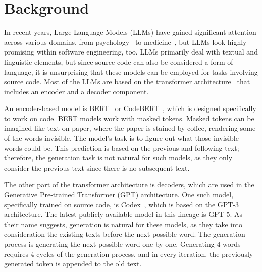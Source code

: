 \chapter{Background}
\label{chap:background}


In recent years, Large Language Models (LLMs) have gained significant attention across various domains, from psychology~\cite{rathje2023gpt} to medicine~\cite{cheng2023artificial}, but LLMs look highly promising within software engineering, too.
LLMs primarily deal with textual and linguistic elements, but since source code can also be considered a form of language, it is unsurprising that these models can be employed for tasks involving source code. 
Most of the LLMs are based on the transformer architecture~\cite{attention} that includes an encoder and a decoder component.

An encoder-based model is BERT~\cite{bert} or CodeBERT~\cite{codebert}, which is designed specifically to work on code.
BERT models work with masked tokens.
Masked tokens can be imagined like text on paper, where the paper is stained by coffee, rendering some of the words invisible.
The model's task is to figure out what those invisible words could be.
This prediction is based on the previous and following text; therefore, the generation task is not natural for such models, as they only consider the previous text since there is no subsequent text.

The other part of the transformer architecture is decoders, which are used in the Generative Pre-trained Transformer (GPT) architecture.
One such model, specifically trained on source code, is Codex~\cite{codex}, which is based on the GPT-3 architecture.
The latest publicly available model in this lineage is GPT-5.
As their name suggests, generation is natural for these models, as they take into consideration the existing texts before the next possible word.
The generation process is generating the next possible word one-by-one.
Generating 4 words requires 4 cycles of the generation process, and in every iteration, the previously generated token is appended to the old text.

